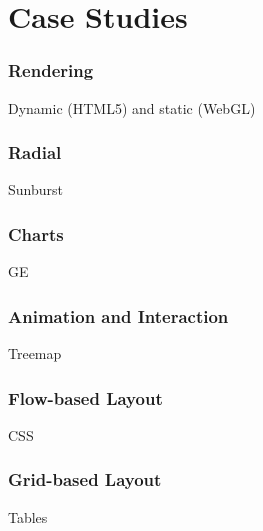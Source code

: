 \chapter{Case Studies}
\subsection{Rendering}
Dynamic (HTML5) and static (WebGL)
\subsection{Radial}
Sunburst
\subsection{Charts}
GE
\subsection{Animation and Interaction}
Treemap
\subsection{Flow-based Layout}
CSS
\subsection{Grid-based Layout}
Tables
